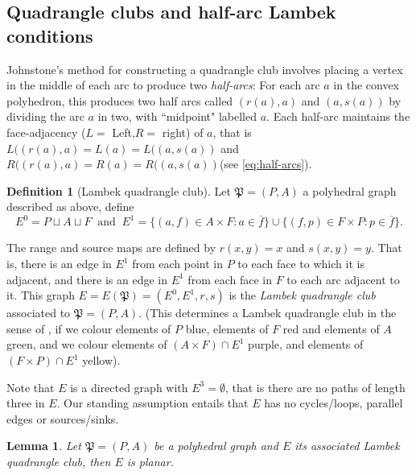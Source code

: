 \documentclass[12pt]{amsart}
\newtheorem{lem}[thm]{Lemma}
\theoremstyle{definition}
\newtheorem{dfn}[thm]{Definition}
\theoremstyle{remark}
\numberwithin{equation}{section}
\begin{document}
\subsection{Quadrangle clubs and half-arc Lambek conditions} \label{sec:Plabel}

Johnstone's method for constructing a quadrangle club involves placing a vertex in the middle of each arc to produce two \emph{half-arcs}: For each arc $a$ in the convex polyhedron, this produces two half arcs called $(r(a),a)$ and $(a,s(a))$ by dividing the arc $a$ in two, with ``midpoint" labelled $a$. Each half-arc maintains the face-adjacency ($L=$ Left,$R=$ right) of $a$, that is $L((r(a),a) = L(a)= L((a,s(a))$ and $R((r(a),a) = R(a) = R((a,s(a))$(see \eqref{eq:half-arcs}).


\begin{dfn}[Lambek quadrangle club]
Let $\mathfrak{P}=(P, A)$ a polyhedral graph described as above, define 
\begin{equation} \label{eq:lqc}
E^0 = P \sqcup A \sqcup F \ \text{ and } \
E^1 = \{(a, f) \in A \times F : a \in \overline{f}\} \cup \{(f, p) \in F \times P : p \in \overline{f}\}.
\end{equation}

\noindent
The range and source maps are defined by $r(x,y) = x$ and $s(x,y) = y$. That is, there is an edge in $E^1$ from each point in $P$ to each face to which it is adjacent, and there is an edge in $E^1$ from each face in $F$ to each arc adjacent to it. This graph $E = E(\mathfrak{P}) = (E^0, E^1, r, s)$ is the \emph{Lambek quadrangle club} associated to $\mathfrak{P} = (P, A)$. (This determines a Lambek quadrangle club in the sense of \cite[Definition~1.2]{Johnstone}, if we colour elements of $P$ blue, elements of $F$ red and elements of $A$ green, and we colour elements of $(A \times F) \cap E^1$ purple, and elements of $(F \times P) \cap E^1$ yellow).
\end{dfn}

\noindent
Note that $E$ is a directed graph with $E^3 = \emptyset$, that is there are no paths of length three in $E$. Our standing assumption entails that $E$ has no cycles/loops, parallel edges or sources/sinks.

\begin{lem}
Let $\mathfrak{P}=(P,A)$ be a polyhedral graph and $E$ its associated Lambek quadrangle club, then $E$ is planar. 
\end{lem}
\end{document}

